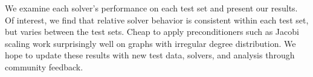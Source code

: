 \documentclass{report}
\begin{document}
We examine each solver's performance on each test set and present our
results. Of interest, we find that relative solver behavior is consistent
within each test set, but varies between the test sets.
Cheap to apply preconditioners such as Jacobi scaling work surprisingly
well on graphs with irregular degree distribution. We hope to update
these results with new test data, solvers, and analysis through community
feedback.
\end{document}
